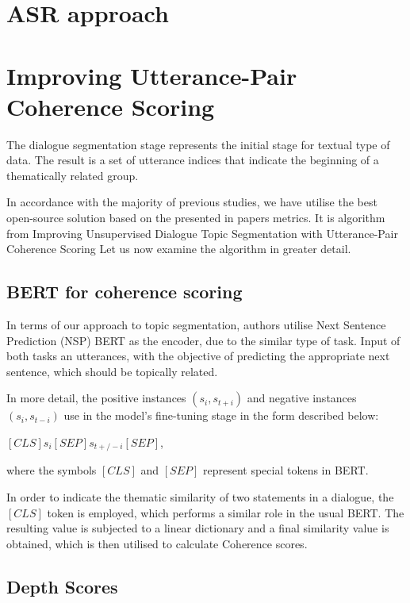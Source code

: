 \documentclass[PMI,VKR]{HSEUniversity}
\begin{document}
\section{ASR approach}


\section{Improving Utterance-Pair Coherence Scoring}

The dialogue segmentation stage represents the initial stage for textual type of data. 
The result is a set of utterance indices that indicate the beginning of a thematically related group. 

In accordance with the majority of previous studies, we have utilise the best open-source solution based on the presented in papers metrics. 
It is algorithm from Improving Unsupervised Dialogue Topic Segmentation with Utterance-Pair Coherence Scoring \cite{depthscore:2021} 
Let us now examine the algorithm in greater detail. 

\subsection{BERT for coherence scoring}

In terms of our approach to topic segmentation, authors utilise Next Sentence Prediction (NSP) BERT as the encoder, due to the similar type of task. 
Input of both tasks an utterances, with the objective of predicting the appropriate next sentence, which should be topically related. 

In more detail, the positive instances $(s_{i}, s_{t+i})$ and negative instances $(s_{i}, s_{t-i})$ use in the model's fine-tuning stage in the form described below: 
\begin{center}
    $[CLS] s_{i} [SEP] s_{t+/-i} [SEP]$,
\end{center}
where the symbols $[CLS]$ and $[SEP]$ represent special tokens in BERT. 

In order to indicate the thematic similarity of two statements in a dialogue, the $[CLS]$ token is employed, which performs a similar role in the usual BERT. 
The resulting value is subjected to a linear dictionary and a final similarity value is obtained, which is then utilised to calculate Coherence scores.

\subsection{Depth Scores}
\end{document}
